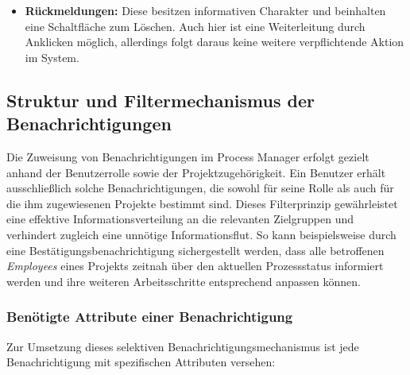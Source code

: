 
\begin{itemize}
    \item \textbf{Rückmeldungen:} Diese besitzen informativen Charakter und beinhalten eine Schaltfläche zum Löschen. Auch hier ist eine Weiterleitung durch Anklicken möglich, allerdings folgt daraus keine weitere verpflichtende Aktion im System.
\end{itemize}


\subsection*{Struktur und Filtermechanismus der Benachrichtigungen}

Die Zuweisung von Benachrichtigungen im Process Manager erfolgt gezielt anhand der Benutzerrolle sowie der Projektzugehörigkeit. Ein Benutzer erhält ausschließlich solche Benachrichtigungen, die sowohl für seine Rolle als auch für die ihm zugewiesenen Projekte bestimmt sind. Dieses Filterprinzip gewährleistet eine effektive Informationsverteilung an die relevanten Zielgruppen und verhindert zugleich eine unnötige Informationsflut. So kann beispielsweise durch eine Bestätigungsbenachrichtigung sichergestellt werden, dass alle betroffenen \textit{Employees} eines Projekts zeitnah über den aktuellen Prozessstatus informiert werden und ihre weiteren Arbeitsschritte entsprechend anpassen können.

\subsubsection*{Benötigte Attribute einer Benachrichtigung}

Zur Umsetzung dieses selektiven Benachrichtigungsmechanismus ist jede Benachrichtigung mit spezifischen Attributen versehen:


